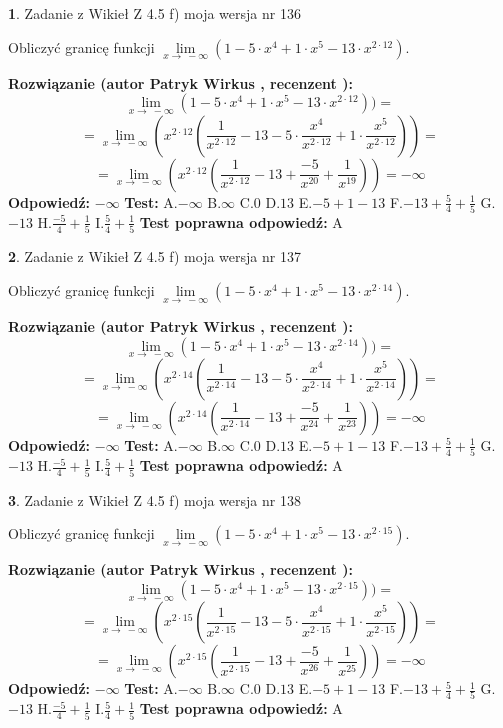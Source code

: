 \documentclass[12pt, a4paper]{article}
\theoremstyle{definition} %
\newtheorem{zad}{}
\newcommand{\zadStart}[1]{\begin{zad}#1\newline}
\newcommand{\zadStop}{\end{zad}}
\newcommand{\rozwStart}[2]{\noindent \textbf{Rozwiązanie (autor #1 , recenzent #2): }\newline}
\newcommand{\rozwStop}{\newline}
\newcommand{\odpStart}{\noindent \textbf{Odpowiedź:}\newline}
\newcommand{\odpStop}{\newline}
\newcommand{\testStart}{\noindent \textbf{Test:}\newline}
\newcommand{\testStop}{\newline}
\newcommand{\kluczStart}{\noindent \textbf{Test poprawna odpowiedź:}\newline}
\newcommand{\kluczStop}{\newline}
\begin{document}
\zadStart{Zadanie z Wikieł Z 4.5 f) moja wersja nr 136}



Obliczyć granicę funkcji  $\lim\limits_{x\to\ -\infty}(1 - 5 \cdot x^{4}+1 \cdot x^{5}- 13 \cdot x^{2\cdot12})$.
\zadStop
\rozwStart{Patryk Wirkus}{}
$$\lim\limits_{x\to\ -\infty}(1 - 5 \cdot x^{4}+1 \cdot x^{5}- 13 \cdot x^{2\cdot12}))=$$
$$=\lim\limits_{x\to\ -\infty}(x^{2\cdot12}(\frac{1}{x^{2\cdot12}}-13 -5 \cdot \frac{x^{4}}{x^{2\cdot12}}+1 \cdot \frac{x^{5}}{x^{2\cdot12}}))=$$
$$=\lim\limits_{x\to\ -\infty}(x^{2\cdot12}(\frac{1}{x^{2\cdot12}}-13 + \frac{-5}{x^{20}}+ \frac{1}{x^{19}}))=-\infty$$
\rozwStop
\odpStart
$-\infty$
\odpStop
\testStart
A.$-\infty$ B.$\infty$ C.$0$ D.$13$ E.$-5 + 1 - 13$
F.$-13+\frac{5}{4}+\frac{1}{5}$ G.$-13$
H.$\frac{-5}{4}+\frac{1}{5}$
I.$\frac{5}{4}+\frac{1}{5}$
\testStop
\kluczStart
A
\kluczStop



\zadStart{Zadanie z Wikieł Z 4.5 f) moja wersja nr 137}



Obliczyć granicę funkcji  $\lim\limits_{x\to\ -\infty}(1 - 5 \cdot x^{4}+1 \cdot x^{5}- 13 \cdot x^{2\cdot14})$.
\zadStop
\rozwStart{Patryk Wirkus}{}
$$\lim\limits_{x\to\ -\infty}(1 - 5 \cdot x^{4}+1 \cdot x^{5}- 13 \cdot x^{2\cdot14}))=$$
$$=\lim\limits_{x\to\ -\infty}(x^{2\cdot14}(\frac{1}{x^{2\cdot14}}-13 -5 \cdot \frac{x^{4}}{x^{2\cdot14}}+1 \cdot \frac{x^{5}}{x^{2\cdot14}}))=$$
$$=\lim\limits_{x\to\ -\infty}(x^{2\cdot14}(\frac{1}{x^{2\cdot14}}-13 + \frac{-5}{x^{24}}+ \frac{1}{x^{23}}))=-\infty$$
\rozwStop
\odpStart
$-\infty$
\odpStop
\testStart
A.$-\infty$ B.$\infty$ C.$0$ D.$13$ E.$-5 + 1 - 13$
F.$-13+\frac{5}{4}+\frac{1}{5}$ G.$-13$
H.$\frac{-5}{4}+\frac{1}{5}$
I.$\frac{5}{4}+\frac{1}{5}$
\testStop
\kluczStart
A
\kluczStop



\zadStart{Zadanie z Wikieł Z 4.5 f) moja wersja nr 138}



Obliczyć granicę funkcji  $\lim\limits_{x\to\ -\infty}(1 - 5 \cdot x^{4}+1 \cdot x^{5}- 13 \cdot x^{2\cdot15})$.
\zadStop
\rozwStart{Patryk Wirkus}{}
$$\lim\limits_{x\to\ -\infty}(1 - 5 \cdot x^{4}+1 \cdot x^{5}- 13 \cdot x^{2\cdot15}))=$$
$$=\lim\limits_{x\to\ -\infty}(x^{2\cdot15}(\frac{1}{x^{2\cdot15}}-13 -5 \cdot \frac{x^{4}}{x^{2\cdot15}}+1 \cdot \frac{x^{5}}{x^{2\cdot15}}))=$$
$$=\lim\limits_{x\to\ -\infty}(x^{2\cdot15}(\frac{1}{x^{2\cdot15}}-13 + \frac{-5}{x^{26}}+ \frac{1}{x^{25}}))=-\infty$$
\rozwStop
\odpStart
$-\infty$
\odpStop
\testStart
A.$-\infty$ B.$\infty$ C.$0$ D.$13$ E.$-5 + 1 - 13$
F.$-13+\frac{5}{4}+\frac{1}{5}$ G.$-13$
H.$\frac{-5}{4}+\frac{1}{5}$
I.$\frac{5}{4}+\frac{1}{5}$
\testStop
\kluczStart
A
\kluczStop
\end{document}
